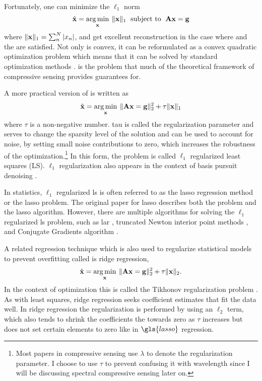 Fortunately, one can minimize the $\ell_1$ norm 
\begin{equation}
	\hat{ \mathbf{x} } = \operatorname*{arg\,min}_{\mathbf{x}} \: \| \mathbf{x} \|_{1} \text{\; subject to \;} \mathbf{A}\mathbf{x} = \mathbf{g}
	\label{eq:l1min}
\end{equation}
where $\| \mathbf{x} \|_1 = \sum_{n}^{N}|x_n|$, and get excellent reconstruction in the case where  and the  are satisfied. Not only is  convex, it can be reformulated as a convex quadratic optimization problem which means that it can be solved by standard optimization methods \cite{donoho2006compressed, candes2006robust, foucart2013mathematical}.  is the problem that much of the theoretical framework of \gls{compressive sensing} provides guarantees for. 

A more practical version of  is written as
%
\begin{equation}
	\hat{ \mathbf{x} } = \operatorname*{arg\,min}_{\mathbf{x}} \: \| \mathbf{Ax} = \mathbf{g} \|_{2}^{2} + \tau \| \mathbf{x} \|_1
	\label{eq:l1regls}
\end{equation}
%
where $\tau$ is a non-negative number. \gls{tau} is called the regularization parameter and serves to change the sparsity level of the solution and can be used to account for noise, by setting small noise contributions to zero, which increases the robustness of the optimization.\footnote{Most papers in compressive sensing use $\lambda$ to denote the regularization parameter. I choose to use $\tau$ to prevent confusing it with wavelength since I will be discussing spectral compressive sensing later on.} In this form, the problem is called $\ell_1$ regularized least squares (LS). $\ell_1$ regularization also appears in the context of basis pursuit denoising \cite{chen2001atomic}. 

In statistics, $\ell_1$ regularized \gls{ls} is often referred to as the \gls{lasso} regression method or the \gls{lasso} problem. The original paper for \gls{lasso} describes both the problem and the \gls{lasso} algorithm. However, there are multiple algorithms for solving the $\ell_1$ regularized \gls{ls} problem, such as \gls{lar} \cite{efron2004least}, truncated Newton interior point methods \cite{kim2007interior}, and Conjugate Gradients algorithm \cite{candes2005l1}. 

A related regression technique which is also used to regularize statistical models to prevent overfitting called is \gls{ridge regression},
%
\begin{equation}
	\hat{ \mathbf{x} } = \operatorname*{arg\,min}_{\mathbf{x}} \: \| \mathbf{Ax} = \mathbf{g} \|_{2}^{2} + \tau \| \mathbf{x} \|_2.
	\label{eq:l2regls}
\end{equation}
%
In the context of optimization this is called the Tikhonov regularization problem \cite{kim2007interior, neumaier1998solving}.  As with least squares, \gls{ridge regression} seeks coefficient estimates that fit the data well. In \gls{ridge regression} the regularization is performed by using an $\ell_2$ term, which also tends to shrink the coefficients the towards zero as $\tau$ increases but does not set certain elements to zero like in $\gls{lasso}$ regression. 

